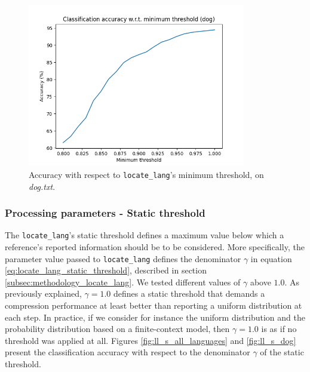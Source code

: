 \documentclass{article}
\begin{document}
\begin{figure}
    \centering
    \includegraphics[width=0.85\textwidth]{../results/dog/ll-m.png}
    \caption{Accuracy with respect to \texttt{locate\_lang}'s minimum threshold, on \textit{dog.txt}.}
    \label{fig:ll_m_dog}
\end{figure}

\subsubsection{Processing parameters - Static threshold}
\label{subsubsec:results_locate_lang_static_threshold_processing}

The \texttt{locate\_lang}'s static threshold defines a maximum value below which a reference's reported information should be to be considered.
More specifically, the parameter value passed to \texttt{locate\_lang} defines the denominator $\gamma$ in equation \ref{eq:locate_lang_static_threshold}, described in section \ref{subsec:methodology_locate_lang}.
We tested different values of $\gamma$ above $1.0$.
As previously explained, $\gamma = 1.0$ defines a static threshold that demands a compression performance at least better than reporting a uniform distribution at each step.
In practice, if we consider for instance the uniform distribution and the probability distribution based on a finite-context model, then $\gamma = 1.0$ is as if no threshold was applied at all.
Figures \ref{fig:ll_s_all_languages} and \ref{fig:ll_s_dog} present the classification accuracy with respect to the denominator $\gamma$ of the static threshold.
\end{document}
